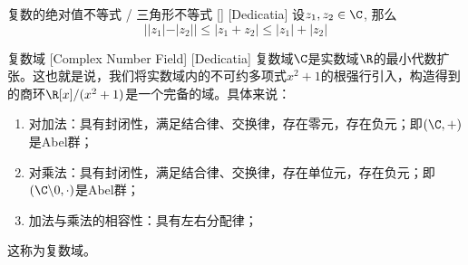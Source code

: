 \documentclass[UTF8]{ctexart}
\begin{document}
\begin{ppt}
    [UUID]
    {复数的绝对值不等式 / 三角形不等式}
    []
    [Dedicatia]
    设$z_1,z_2\in\C$, 那么
    \[||z_1|-|z_2||\leq|z_1+z_2|\leq|z_1|+|z_2|\]
\end{ppt}
\begin{dfn}
    [UUID]
    {复数域}
    [Complex Number Field]
    [Dedicatia]
    复数域$\C$是实数域$\R$的最小代数扩张。这也就是说，我们将实数域内的不可约多项式$x^2+1$的根强行引入，构造得到的商环$\R[x]/(x^2+1)$是一个完备的域。具体来说：
    \begin{enumerate}
        \item 对加法：具有封闭性，满足结合律、交换律，存在零元，存在负元；即$(\C,+)$是Abel群；
        \item 对乘法：具有封闭性，满足结合律、交换律，存在单位元，存在负元；即$(\C\backslash 0,\cdot)$是Abel群；
        \item 加法与乘法的相容性：具有左右分配律；
    \end{enumerate}
    这称为复数域。
\end{dfn}
\end{document}
